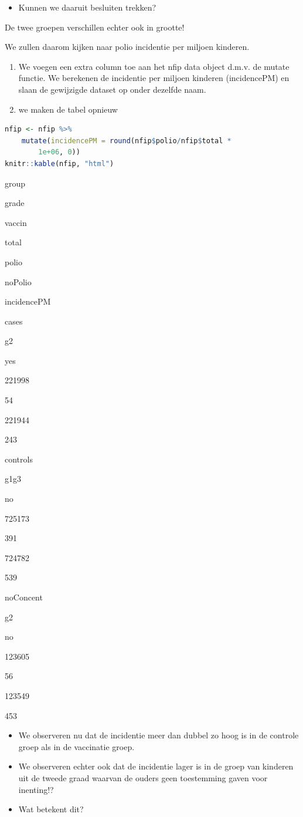 \documentclass[
  12pt,dutch,coursenotes]{book}
\providecommand{\tightlist}{%
  \setlength{\itemsep}{0pt}\setlength{\parskip}{0pt}}
\begin{document}
\begin{itemize}
\tightlist
\item
  Kunnen we daaruit besluiten trekken?
\end{itemize}

De twee groepen verschillen echter ook in grootte!

We zullen daarom kijken naar polio incidentie per miljoen kinderen.

\begin{enumerate}
\def\labelenumi{\arabic{enumi}.}
\tightlist
\item
  We voegen een extra column toe aan het nfip data object d.m.v. de mutate functie. We berekenen de incidentie per miljoen kinderen (incidencePM) en slaan de gewijzigde dataset op onder dezelfde naam.
\item
  we maken de tabel opnieuw
\end{enumerate}

\begin{lstlisting}[language=R]
nfip <- nfip %>%
    mutate(incidencePM = round(nfip$polio/nfip$total *
        1e+06, 0))
knitr::kable(nfip, "html")
\end{lstlisting}

group

grade

vaccin

total

polio

noPolio

incidencePM

cases

g2

yes

221998

54

221944

243

controls

g1g3

no

725173

391

724782

539

noConcent

g2

no

123605

56

123549

453

\begin{itemize}
\item
  We observeren nu dat de incidentie meer dan dubbel zo hoog is in de controle groep als in de vaccinatie groep.
\item
  We observeren echter ook dat de incidentie lager is in de groep van kinderen uit de tweede graad waarvan de ouders geen toestemming gaven voor inenting!?
\item
  Wat betekent dit?
\end{itemize}
\end{document}
